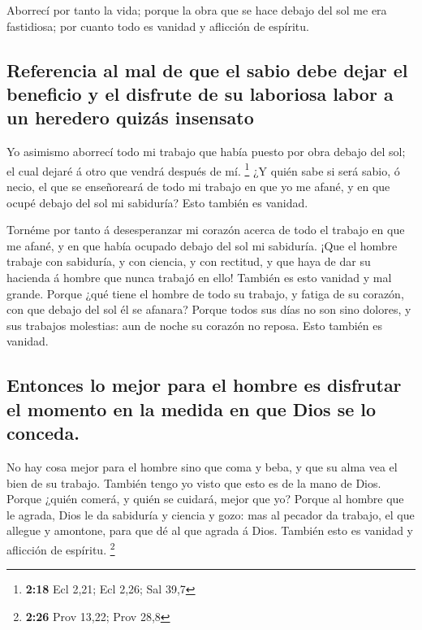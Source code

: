  Aborrecí por tanto la vida; porque la obra que se hace
debajo del sol me era fastidiosa; por cuanto todo es vanidad y aflicción
de espíritu.

\hypertarget{referencia-al-mal-de-que-el-sabio-debe-dejar-el-beneficio-y-el-disfrute-de-su-laboriosa-labor-a-un-heredero-quizuxe1s-insensato}{%
\subsection{Referencia al mal de que el sabio debe dejar el beneficio y
el disfrute de su laboriosa labor a un heredero quizás
insensato}\label{referencia-al-mal-de-que-el-sabio-debe-dejar-el-beneficio-y-el-disfrute-de-su-laboriosa-labor-a-un-heredero-quizuxe1s-insensato}}

 Yo asimismo aborrecí todo mi trabajo que había puesto por
obra debajo del sol; el cual dejaré á otro que vendrá después de mí.
\footnote{\textbf{2:18} Ecl 2,21; Ecl 2,26; Sal 39,7}  ¿Y
quién sabe si será sabio, ó necio, el que se enseñoreará de todo mi
trabajo en que yo me afané, y en que ocupé debajo del sol mi sabiduría?
Esto también es vanidad.

 Tornéme por tanto á desesperanzar mi corazón acerca de
todo el trabajo en que me afané, y en que había ocupado debajo del sol
mi sabiduría.  ¡Que el hombre trabaje con sabiduría, y con
ciencia, y con rectitud, y que haya de dar su hacienda á hombre que
nunca trabajó en ello! También es esto vanidad y mal grande.
 Porque ¿qué tiene el hombre de todo su trabajo, y fatiga
de su corazón, con que debajo del sol él se afanara? 
Porque todos sus días no son sino dolores, y sus trabajos molestias: aun
de noche su corazón no reposa. Esto también es vanidad.

\hypertarget{entonces-lo-mejor-para-el-hombre-es-disfrutar-el-momento-en-la-medida-en-que-dios-se-lo-conceda.}{%
\subsection{Entonces lo mejor para el hombre es disfrutar el momento en
la medida en que Dios se lo
conceda.}\label{entonces-lo-mejor-para-el-hombre-es-disfrutar-el-momento-en-la-medida-en-que-dios-se-lo-conceda.}}

 No hay cosa mejor para el hombre sino que coma y beba, y
que su alma vea el bien de su trabajo. También tengo yo visto que esto
es de la mano de Dios.  Porque ¿quién comerá, y quién se
cuidará, mejor que yo?  Porque al hombre que le agrada,
Dios le da sabiduría y ciencia y gozo: mas al pecador da trabajo, el que
allegue y amontone, para que dé al que agrada á Dios. También esto es
vanidad y aflicción de espíritu. \footnote{\textbf{2:26} Prov 13,22;
  Prov 28,8}

